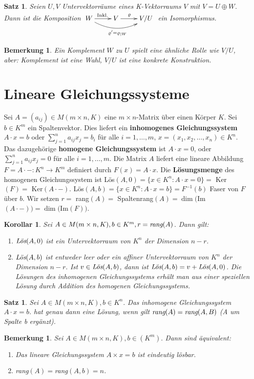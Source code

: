 \documentclass[12pt,a4paper]{article}
\theoremstyle{plain}
\newtheorem{Satz}[Theorem]{Satz}
\newtheorem{Korollar}[Theorem]{Korollar}
\newtheorem{Bemerkung}[Theorem]{Bemerkung}
\numberwithin{equation}{section}
\begin{document}
\begin{Satz}
Seien $U,V$ Untervektorräume eines K-Vektorraums $V$ mit $V=U\oplus W$. Dann ist die Komposition $ \begin{xy}
\xymatrix{
	W \ar[r]^{\text{Inkl.}} \ar@/_ 0.5cm/[rr]_{\varrho'=\varrho_{|W}} & V \ar[r]^/-0.25em/\varrho & V/U
}
\end{xy} $ ein Isomorphismus.
\end{Satz}
\begin{Bemerkung}
Ein Komplement $W$ zu $U$ spielt eine ähnliche Rolle wie $V/U$, aber: Komplement ist eine Wahl, $V/U$ ist eine konkrete Konstruktion.
\end{Bemerkung}
\section{Lineare Gleichungssysteme}
Sei $A=(a_{ij})\in M(m\times n,K)$ eine $m\times n$-Matrix über einen Körper $K$. Sei $b\in K^m$ ein Spaltenvektor. Dies liefert ein \textbf{inhomogenes Gleichungssystem} $A\cdot x=b$ oder $\sum_{j=1}^n {a_{ij}x_j}=b_i$ für alle $i=1,\ldots,m$, $x=(x_1,x_2,\ldots,x_n) \in K^n$. Das dazugehörige \textbf{homogene Gleichungssystem} ist $A\cdot x=0$, oder $\sum_{j=1}^n{a_{ij}x_j}=0$ für alle $i=1,\ldots,m$. Die Matrix $A$ liefert eine lineare Abbildung $F=A\cdot -: K^n \rightarrow K^m$ definiert durch $F(x)=A\cdot x$. Die \textbf{Lösungsmenge} des homogenen Gleichungssystem ist Lös$(A,0)=\{x\in K^n:A\cdot x=0\}=$ Ker$(F)=$ Ker$(A\cdot -)$. Lös$(A,b)=\{x\in K^n:A\cdot x=b\}=F^{-1}(b)$ Faser von $F$ über $b$. Wir setzen $r=$ rang$(A)=$ Spaltenrang$(A)=\dim($Im$(A\cdot -))=\dim($Im$(F))$.
\begin{Korollar}
Sei $A\in M(m\times n,K), b\in K^m, r=\emph{rang}(A)$. Dann gilt: \begin{enumerate}
\renewcommand{\labelenumi}{\emph{\arabic{enumi})}}
\item $\emph{Lös}(A,0)$ ist ein Untervektorraum von $K^n$ der Dimension $n-r$.
\item $\emph{Lös}(A,b)$ ist entweder leer oder ein affiner Untervektorraum von $K^n$ der Dimension $n-r$. Ist $v\in \emph{Lös}(A,b)$, dann ist $\emph{Lös}(A,b)=v+\emph{Lös}(A,0)$. \glqq Die Lösungen des inhomogenen Gleichungssystems erhält man aus einer speziellen Lösung durch Addition des homogenen Gleichungssystems\grqq.
\end{enumerate}
\end{Korollar}
\begin{Satz}
Sei $A\in M(m\times n,K), b\in K^n$. Das inhomogene Gleichungssystem $A\cdot x=b$. hat genau dann eine Lösung, wenn gilt $\emph{rang}(A)=\emph{rang}(A,B)$ (A um Spalte b ergänzt).
\end{Satz}
\begin{Bemerkung}
Sei $A\in M(m\times n, K),b\in (K^m).$ Dann sind äquivalent: \begin{enumerate}
\renewcommand{\labelenumi}{(\roman{enumi})}
\item Das lineare Gleichungssystem $A\times x=b$ ist eindeutig lösbar.
\item rang$(A)=$rang$(A,b)=n$.
\end{enumerate}
\end{Bemerkung}
\end{document}
